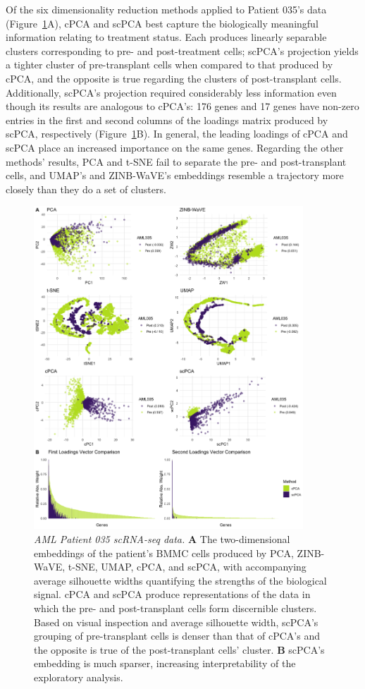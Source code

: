 Of the six dimensionality reduction methods applied to Patient 035's data (Figure~\ref{fig:comp_leuk_pat1}A), cPCA and scPCA best capture the biologically meaningful information relating to treatment status. Each produces linearly separable clusters corresponding to pre- and post-treatment cells; scPCA's projection yields a tighter cluster of pre-transplant cells when compared to that produced by cPCA, and the opposite is true regarding the clusters of post-transplant cells. Additionally, scPCA's projection required considerably less information even though its results are analogous to cPCA's: 176 genes and 17 genes have non-zero entries in the first and second columns of the loadings matrix produced by scPCA, respectively (Figure~\ref{fig:comp_leuk_pat1}B). In general, the leading loadings of cPCA and scPCA place an increased importance on the same genes. Regarding the other methods' results, PCA and t-SNE fail to separate the pre- and post-transplant cells, and UMAP's and ZINB-WaVE's embeddings resemble a trajectory more closely than they do a set of clusters.
\FloatBarrier
\begin{figure}[!htbp]
  \centering
  \includegraphics[width=0.9\textwidth]{figures/aml035_results}
  \caption{{\em AML Patient 035 scRNA-seq data.} 
  \textbf{A} The two-dimensional embeddings of the patient's BMMC cells produced by PCA, ZINB-WaVE, t-SNE, UMAP, cPCA, and scPCA, with accompanying average silhouette widths quantifying the strengths of the biological signal. cPCA and scPCA produce representations of the data in which the pre- and post-transplant cells form discernible clusters. Based on visual inspection and average silhouette width, scPCA's grouping of pre-transplant cells is denser than that of cPCA's and the opposite is true of the post-transplant cells' cluster. \textbf{B} scPCA's embedding is much sparser, increasing interpretability of the exploratory analysis.}
  \label{fig:comp_leuk_pat1}
\end{figure}

